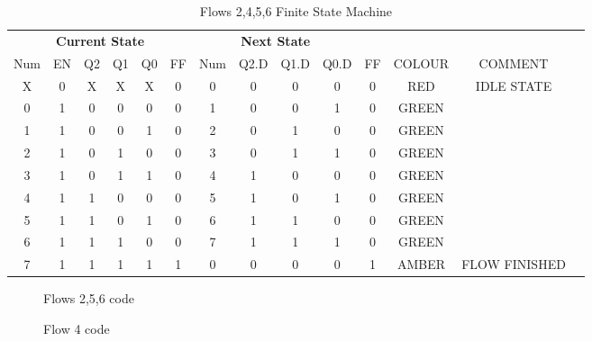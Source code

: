 \begin{table*}
\begin{tabularx}{\linewidth}{ c c c c c c | c c c c c | c c X}
  \multicolumn{6}{c|}{\textbf{Current State}} & \multicolumn{4}{c}{\textbf{Next State}} & & \\
  Num & EN & Q2 & Q1 & Q0 & FF & Num & Q2.D & Q1.D & Q0.D & FF & COLOUR & COMMENT \\ \hline 
    X &  0 &  X &  X &  X &  0 &   0 &    0 &    0 &    0 &  0 & RED    & IDLE STATE \\
    0 &  1 &  0 &  0 &  0 &  0 &   1 &    0 &    0 &    1 &  0 & GREEN  &  \\
    1 &  1 &  0 &  0 &  1 &  0 &   2 &    0 &    1 &    0 &  0 & GREEN  &  \\
    2 &  1 &  0 &  1 &  0 &  0 &   3 &    0 &    1 &    1 &  0 & GREEN  &  \\
    3 &  1 &  0 &  1 &  1 &  0 &   4 &    1 &    0 &    0 &  0 & GREEN  &  \\
    4 &  1 &  1 &  0 &  0 &  0 &   5 &    1 &    0 &    1 &  0 & GREEN  &  \\
    5 &  1 &  1 &  0 &  1 &  0 &   6 &    1 &    1 &    0 &  0 & GREEN  &  \\
    6 &  1 &  1 &  1 &  0 &  0 &   7 &    1 &    1 &    1 &  0 & GREEN  &  \\
    7 &  1 &  1 &  1 &  1 &  1 &   0 &    0 &    0 &    0 &  1 & AMBER  & FLOW FINISHED \\
  \end{tabularx}
\caption{Flows 2,4,5,6 Finite State Machine}
\label{tab:F2456sm}
\end{table*}

\begin{figure*}

\caption{Flows 2,5,6 code}
\label{lst:F256}
\end{figure*}

\begin{figure*}

\caption{Flow 4 code}
\label{lst:F4}
\end{figure*}


